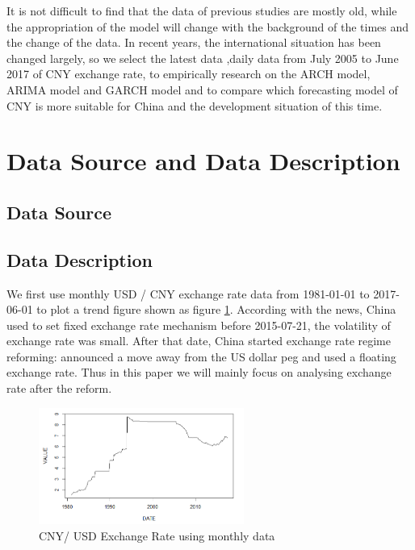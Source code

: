\documentclass[12pt, a4paper, titlepage]{article}
\begin{document}
It is not difficult to find that the data of previous studies are mostly old, while the appropriation of the model will change with the background of the times and the change of the data. In recent years, the international situation has been changed largely, so we select the latest data ,daily data from July 2005 to June 2017 of CNY exchange rate, to empirically research on the ARCH model, ARIMA model and GARCH model and to compare which forecasting model of CNY is more suitable for China and the development situation of this time.\\

\section{Data Source and Data Description}
\subsection{Data Source}

\subsection{Data Description}
We first use monthly USD / CNY exchange rate data from 1981-01-01 to 2017-06-01 to plot a trend figure shown as figure \ref{monthly}. According with the news, China used to set fixed exchange rate mechanism before 2015-07-21, the volatility of exchange rate was small. After that date, China started exchange rate regime reforming: announced a move away from the US dollar peg and used a floating exchange rate. Thus in this paper we will mainly focus on analysing exchange rate after the reform.\\ 
\begin{figure}
\begin{center}
\caption{CNY/ USD Exchange Rate using monthly data}\label{monthly}
\includegraphics[width=0.6\textwidth]{monthly.png} 
\end{center}
\end{figure}
\end{document}
